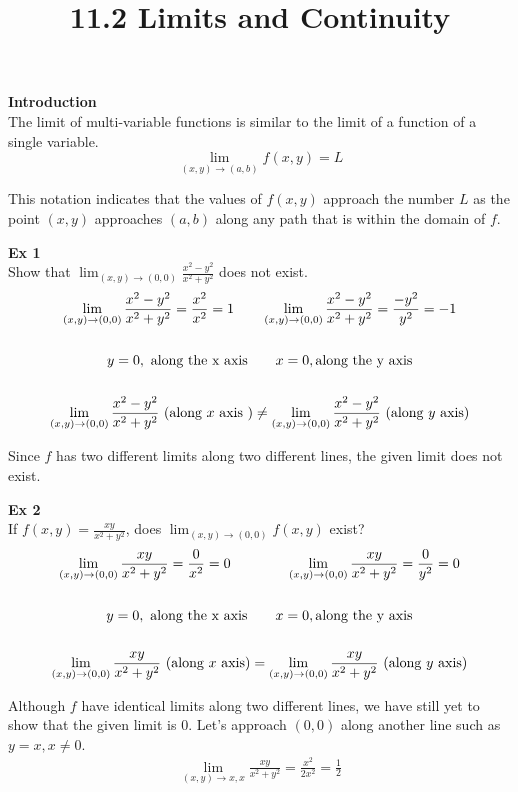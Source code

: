 \documentclass{article}
\title{11.2 Limits and Continuity}
\begin{document}
  \maketitle
  \textbf{Introduction}\\
  The limit of multi-variable functions is similar to the limit of a function of a single variable.
  \[
    \lim_{(x,y)\to(a,b)}f(x,y)=L 
  \]

  This notation indicates that the values of $ f(x,y) $ approach the number $ L $ as the point $ (x,y) $ approaches $ (a,b) $ along any path that is within the domain of $ f $.
  
 \textbf{Ex 1}\\
 Show that $ \lim_{(x,y)\to(0,0)}\frac{x^{2}-y^{2}}{x^{2}+y^{2}}$ does not exist.
 \[
   \begin{gathered}
   \lim_{(x,y) \to (0,0)} \frac{x^{2}-y^{2}}{x^{2}+y^{2}}=\frac{x^{2}}{x^{2}}=1 \qquad \lim_{(x,y) \to (0,0)} \frac{x^{2}-y^{2}}{x^{2}+y^{2}}=\frac{-y^{2}}{y^{2}}=-1\\
   ~\\
   y=0,\text{ along the x axis} \qquad x=0, \text{along the y axis}\\
   ~\\
   \lim_{(x,y)\to(0,0)} \frac{x^{2}-y^{2}}{x^{2}+y^{2}} \text{ (along $ x $ axis )} \neq \lim_{(x,y)\to(0,0)} \frac{x^{2}-y^{2}}{x^{2}+y^{2}} \text{ (along $ y $ axis)}   
   \end{gathered}
 \]

 Since $ f $ has two different limits along two different lines, the given limit does not exist.

 \textbf{Ex 2}\\
 If $ f(x,y)  = \frac{xy}{x^{2}+y^{2}  }$, does $ \lim_{(x,y)\to(0,0)} f(x,y) $ exist?
 \[
   \begin{gathered}
   \lim_{(x,y)\to (0,0)} \frac{xy}{x^{2}+y^{2}}=\frac{0}{x^{2}} = 0 \qquad \qquad \lim_{(x,y)\to (0,0)} \frac{xy}{x^{2}+y^{2}}=\frac{0}{y^{2} }=0\\
   ~\\
   y=0,\text{ along the x axis} \qquad x=0, \text{along the y axis}\\
   ~\\
   \lim_{(x,y)\to (0,0)} \frac{xy}{x^{2}+y^{2}} \text{ (along $ x $ axis)} =  \lim_{(x,y)\to (0,0)} \frac{xy}{x^{2}+y^{2}} \text{ (along $ y $ axis)} 
   \end{gathered}
 \]

 Although $ f $ have identical limits along two different lines, we have still yet to show that the given limit is $ 0 $. Let's approach $ (0,0) $ along another line such as $ y=x, x\neq0 $.
 \[
   \begin{gathered}
   \lim_{(x,y)\to x,x} \frac{xy}{x^{2}+y^{2}} =\frac{x^{2}}{2x^{2}}=\frac{1}{2}\\
   \end{gathered}
 \]
\end{document}
